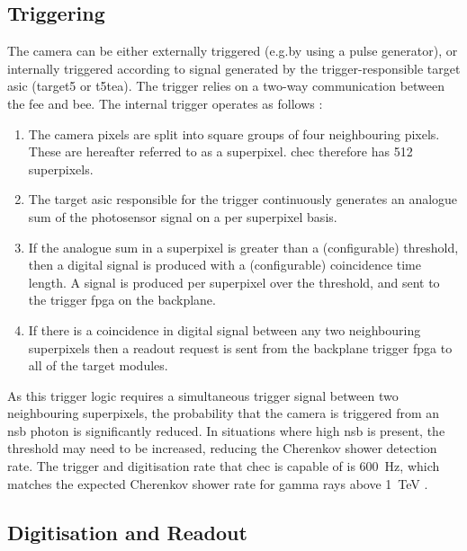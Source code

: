 \subsection{Triggering} \label{section:triggering}

The camera can be either externally triggered (e.g.\@ by using a pulse generator), or internally triggered according to signal generated by the trigger-responsible \gls{target} \gls{asic} (\gls{target5} or \gls{t5tea}). The trigger relies on a two-way communication between the \gls{fee} and \gls{bee}. The internal trigger operates as follows \cite{Zorn2017}:
\begin{enumerate}
\item The camera pixels are split into square groups of four neighbouring pixels. These are hereafter referred to as a \gls{superpixel}. \gls{chec} therefore has 512 superpixels.
\item The \gls{target} \gls{asic} responsible for the trigger continuously generates an analogue sum of the photosensor signal on a per superpixel basis.
\item If the analogue sum in a superpixel is greater than a (configurable) threshold, then a digital signal is produced with a (configurable) coincidence time length. A signal is produced per superpixel over the threshold, and sent to the trigger \gls{fpga} on the backplane.
\item If there is a coincidence in digital signal between any two neighbouring superpixels then a readout request is sent from the backplane trigger \gls{fpga} to all of the \gls{target} modules.
\end{enumerate}
As this trigger logic requires a simultaneous trigger signal between two neighbouring superpixels, the probability that the camera is triggered from an \gls{nsb} photon is significantly reduced. In situations where high \gls{nsb} is present, the threshold may need to be increased, reducing the Cherenkov shower detection rate. The trigger and digitisation rate that \gls{chec} is capable of is \SI{600}{Hz}, which matches the expected Cherenkov shower rate for gamma rays above \SI{1}{TeV} \cite{Zorn2017}.

\subsection{Digitisation and Readout}

